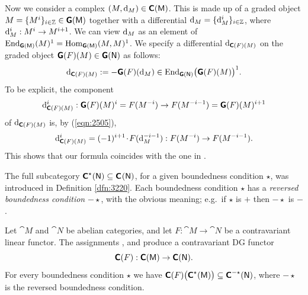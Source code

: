Now we consider a complex $(M, \mathrm{d}_M) \in \boldsymbol{\mathsf{C}}(\operatorname{\mathsf{M}})$. 
This is made up of a graded object 
$M  = \{ M^i \}_{i \in \mathbb{Z}} \in \boldsymbol{\mathsf{G}}(\operatorname{\mathsf{M}})$ together 
with a differential $\mathrm{d}_M = \{ \mathrm{d}_M^i \}_{i \in \mathbb{Z}}$, 
where $\mathrm{d}_M^i : M^i \to M^{i + 1}$. 
We can view $\mathrm{d}_M$ as an element of 
$\operatorname{End}_{\boldsymbol{\mathsf{G}}(\operatorname{\mathsf{M}})}(M)^1 = 
\operatorname{Hom}_{\boldsymbol{\mathsf{G}}(\operatorname{\mathsf{M}})}(M, M) ^1$.
We specify a differential 
$\mathrm{d}_{\boldsymbol{\mathsf{C}}(F)(M)}$ on the graded object 
$\boldsymbol{\mathsf{G}}(F)(M) \in \boldsymbol{\mathsf{G}}(\operatorname{\mathsf{N}})$
as follows: 
\begin{equation} \label{eqn:2506}
\mathrm{d}_{\boldsymbol{\mathsf{C}}(F)(M)} := - \boldsymbol{\mathsf{G}}(F)(\mathrm{d}_M) \in 
\operatorname{End}_{\boldsymbol{\mathsf{G}}(\operatorname{\mathsf{N}})} \bigl( \boldsymbol{\mathsf{G}}(F)(M) \bigr)^1 . 
\end{equation}
To be explicit, the component 
\[ \mathrm{d}_{\boldsymbol{\mathsf{C}}(F)(M)}^i : \boldsymbol{\mathsf{G}}(F)(M)^i = F(M^{-i}) \to 
F(M^{-i - 1}) = \boldsymbol{\mathsf{G}}(F)(M)^{i + 1} \]
of $\mathrm{d}_{\boldsymbol{\mathsf{C}}(F)(M)}$ is, by (\ref{eqn:2505}), 
\begin{equation} \label{eqn:2365}
\mathrm{d}_{\boldsymbol{\mathsf{C}}(F)(M)}^i = (-1)^{i + 1} \mspace{1.5mu}{\cdot}\mspace{1.5mu} F(\mathrm{d}_M^{-i - 1}) :
F(M^{-i}) \to F(M^{-i - 1}) . 
\end{equation}
This shows that our formula coincides with the one in 
\cite[Remark 1.8.11]{KaSc1}. 

The full subcategory $\boldsymbol{\mathsf{C}}^{\star}(\operatorname{\mathsf{N}}) \subseteq \boldsymbol{\mathsf{C}}^{}(\operatorname{\mathsf{N}})$, for 
a given boundedness condition $\star$, was introduced in Definition 
\ref{dfn:3220}. Each boundedness condition $\star$ has a {\em reversed 
boundedness condition} $-\star$, with the obvious meaning; e.g.\ if 
$\star$ is $+$ then $-\star$ is $-$. 

\begin{thm} \label{thm:3015} 
Let $\cat{M}$ and $\cat{N}$ be abelian categories, and let 
$F : \cat{M} \to \cat{N}$ be a contravariant linear functor. 
The assignments \tup{(\ref{eqn:2496})}, \tup{(\ref{eqn:2497})} and 
\tup{(\ref{eqn:2506})} produce a contravariant DG functor 
\[ \boldsymbol{\mathsf{C}}(F) : \boldsymbol{\mathsf{C}}(\operatorname{\mathsf{M}}) \to \boldsymbol{\mathsf{C}}(\operatorname{\mathsf{N}}) . \]
For every boundedness condition $\star$ we have 
$\boldsymbol{\mathsf{C}}(F) \bigl( \boldsymbol{\mathsf{C}}^{\star}(\operatorname{\mathsf{M}}) \bigr) \subseteq
\boldsymbol{\mathsf{C}}^{- \star}(\operatorname{\mathsf{N}})$,
where $-\star$ is the reversed boundedness condition. 
\end{thm}

